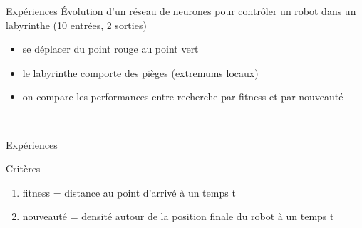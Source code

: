 \documentclass{beamer}
\begin{document}
\begin{frame}{Expériences}
Évolution d'un réseau de neurones pour contrôler un robot dans un labyrinthe (10 entrées, 2 sorties)
\begin{itemize}
    \item se déplacer du point rouge au point vert
    \item le labyrinthe comporte des pièges (extremums locaux)
    \item on compare les performances entre recherche par fitness et par nouveauté %
\end{itemize}
\begin{figure}
    \centering
    ~~~
    ~~~
\end{figure}
\end{frame}


\begin{frame}{Expériences}
\begin{block}{Critères}
    \begin{enumerate}
        \item fitness = distance au point d'arrivé à un temps t
        \item nouveauté = densité autour de la position finale du robot à un temps t
    \end{enumerate}
\end{block}
\end{frame}
\end{document}

